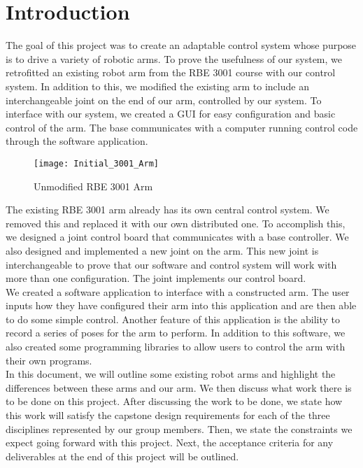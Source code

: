 \section{Introduction} 


The goal of this project was to create an adaptable control system whose purpose is to drive a variety of robotic arms. To prove the usefulness of our system, we retrofitted an existing robot arm from the RBE 3001 course with our control system.  In addition to this, we modified the existing arm to include an interchangeable joint on the end of our arm, controlled by our system. To interface with our system, we created a GUI for easy configuration and basic control of the arm. The base communicates with a computer running control code through the software application. \\
\newline

\begin{figure}[H]
\centering
\texttt{[image: Initial\_3001\_Arm]}
\caption{Unmodified RBE 3001 Arm}
\label{fig:Functional_Block_Diagram}
\end{figure}

\newline
The existing RBE 3001 arm already has its own central control system. We removed this and replaced it with our own distributed one. To accomplish this, we designed a joint control board that communicates with a base controller.  We also designed and implemented a new joint on the arm. This new joint is interchangeable to prove that our software and control system will work with more than one configuration. The joint implements our control board. \\


\newline
We created a software application to interface with a constructed arm. The user inputs how they have configured their arm into this application and are then able to do some simple control. Another feature of this application is the ability to record a series of poses for the arm to perform. In addition to this software, we also created some programming libraries to allow users to control the arm with their own programs. \\
\newline
In this document, we will outline some existing robot arms and highlight the differences between these arms and our arm. We then discuss what work there is to be done on this project. After discussing the work to be done, we state how this work will satisfy the capstone design requirements for each of the three disciplines represented by our group members. Then, we state the constraints we expect going forward with this project. Next, the acceptance criteria for any deliverables at the end of this project will be outlined. 
